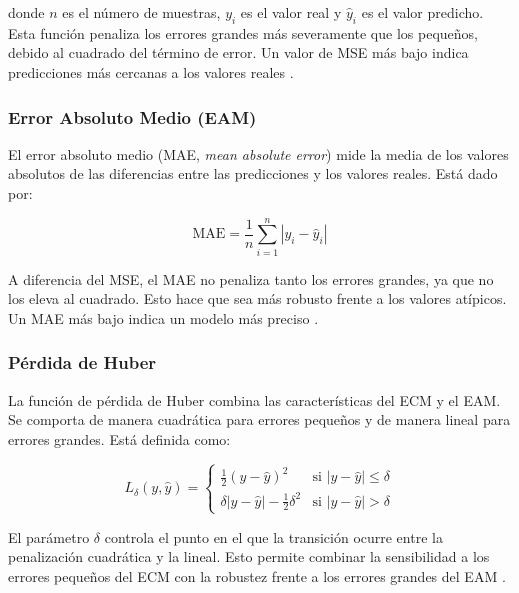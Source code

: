 donde \(n\) es el número de muestras, \(y_i\) es el valor real y \(\hat{y}_i\) es el valor predicho. Esta función penaliza los errores grandes más severamente que los pequeños, debido al cuadrado del término de error. Un valor de MSE más bajo indica predicciones más cercanas a los valores reales \cite{pajares2021aprendizaje}.

\subsubsection{Error Absoluto Medio (EAM)}

El error absoluto medio (MAE, \textit{mean absolute error}) mide la media de los valores absolutos de las diferencias entre las predicciones y los valores reales. Está dado por:

\begin{equation}
    \text{MAE} = \frac{1}{n} \sum_{i=1}^{n} |y_i - \hat{y}_i|
\end{equation}

A diferencia del MSE, el MAE no penaliza tanto los errores grandes, ya que no los eleva al cuadrado. Esto hace que sea más robusto frente a los valores atípicos. Un MAE más bajo indica un modelo más preciso \cite{pajares2021aprendizaje}.

\subsubsection{Pérdida de Huber}

La función de pérdida de Huber combina las características del ECM y el EAM. Se comporta de manera cuadrática para errores pequeños y de manera lineal para errores grandes. Está definida como:

\begin{equation}
    L_\delta(y, \hat{y}) = 
    \begin{cases} 
      \frac{1}{2}(y - \hat{y})^2 & \text{si } |y - \hat{y}| \leq \delta \\ 
      \delta |y - \hat{y}| - \frac{1}{2}\delta^2 & \text{si } |y - \hat{y}| > \delta 
    \end{cases}
\end{equation}

El parámetro \(\delta\) controla el punto en el que la transición ocurre entre la penalización cuadrática y la lineal. Esto permite combinar la sensibilidad a los errores pequeños del ECM con la robustez frente a los errores grandes del EAM \cite{pajares2021aprendizaje}.

